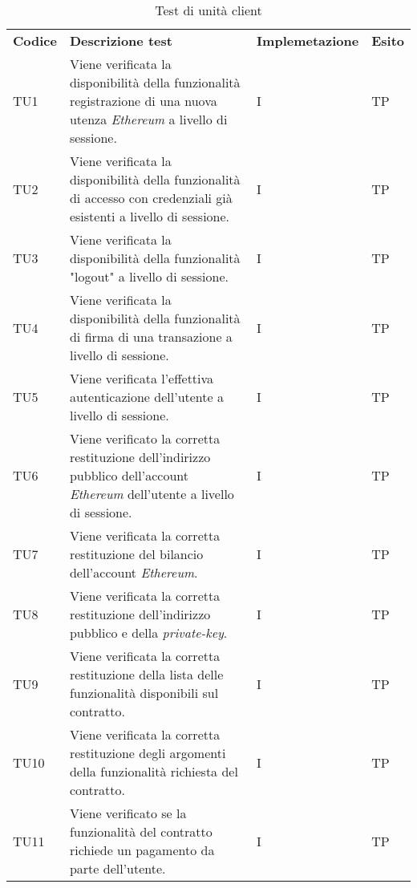 \begin{longtable}{|C{1.5cm}|C{8cm}|C{3cm}|C{1cm}|}

	\caption{Test di unità client}\\
	\hline

	\textbf{Codice} & \textbf{Descrizione test}  & \textbf{Implemetazione}& \textbf{Esito}
	\tabularnewline
	\endfirsthead

	TU1 &
	Viene verificata la disponibilità della funzionalità registrazione di una nuova utenza \textit{Ethereum\glo} a livello di sessione.  &
	I & TP\\

	TU2 &
	Viene verificata la disponibilità della funzionalità di accesso con credenziali già esistenti a livello di sessione.  &
	I & TP\\

	TU3 &
	Viene verificata la disponibilità della funzionalità "logout" a livello di sessione.  &
	I & TP\\

	TU4 &
	Viene verificata la disponibilità della funzionalità di firma di una transazione a livello di sessione.  &
	I & TP\\

	TU5 &
	Viene verificata l'effettiva autenticazione dell'utente a livello di sessione.  &
	I & TP\\

	TU6 &
	Viene verificato la corretta restituzione dell'indirizzo pubblico dell'account \textit{Ethereum\glo} dell'utente a livello di sessione.  &
	I & TP\\

	TU7 &
	Viene verificata la corretta restituzione del bilancio dell'account \textit{Ethereum\glos}.  &
	I & TP\\

	TU8 &
	Viene verificata la corretta restituzione dell'indirizzo pubblico e della \textit{private-key\glos}.  &
	I & TP\\

	TU9 &
	Viene verificata la corretta restituzione della lista delle funzionalità disponibili sul contratto.  &
	I & TP\\

	TU10 &
	Viene verificata la corretta restituzione degli argomenti della funzionalità richiesta del contratto.  &
	I & TP\\

	TU11 &
	Viene verificato se la funzionalità del contratto richiede un pagamento da parte dell'utente.  &
	I & TP\\


\end{longtable}
